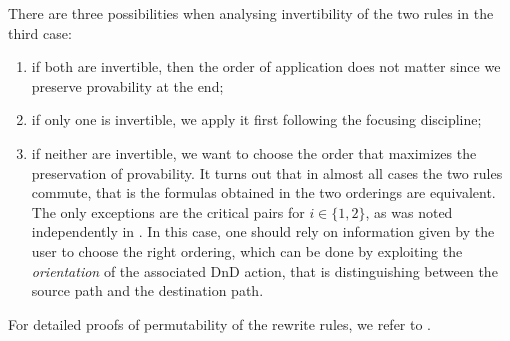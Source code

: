 There are three possibilities when analysing invertibility of the two rules in
the third case:
\begin{enumerate}
  \item if both are invertible, then the order of application does not matter
  since we preserve provability at the end;
  \item if only one is invertible, we apply it first following the focusing
  discipline;
  \item if neither are invertible, we want to choose the order that maximizes
  the preservation of provability. It turns out that in almost all cases the two
  rules commute, that is the formulas obtained in the two orderings are
  equivalent. The only exceptions are the critical pairs  for $i \in \{1,2\}$, as was noted independently in
  \cite{DBLP:conf/cade/Chaudhuri21}. In this case, one should rely on
  information given by the user to choose the right ordering, which can be done
  by exploiting the \emph{orientation} of the associated DnD action, that is
  distinguishing between the source path and the destination path.
\end{enumerate}
For detailed proofs of permutability of the rewrite rules, we refer to
.


